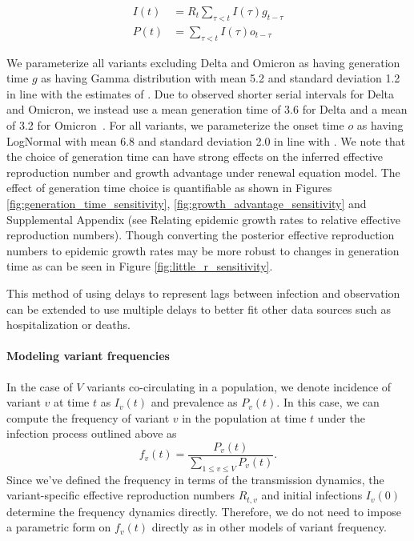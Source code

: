 \begin{align}
  I(t) &= R_{t} \sum_{\tau < t} I(\tau) g_{t-\tau}\\
  P(t) &= \sum_{\tau < t} I(\tau) o_{t-\tau}
\end{align}

We parameterize all variants excluding Delta and Omicron as having generation time $g$ as having Gamma distribution with mean 5.2 and standard deviation 1.2 in line with the estimates of \cite{Ganyani2020}.
Due to observed shorter serial intervals for Delta and Omicron, we instead use a mean generation time of 3.6 for Delta and a mean of 3.2 for Omicron\ \cite{Backer2022, Ryu2022, Song2022}.
For all variants, we parameterize the onset time $o$ as having LogNormal with mean 6.8 and standard deviation 2.0 in line with \cite{Cheng2021}.
We note that the choice of generation time can have strong effects on the inferred effective reproduction number and growth advantage under renewal equation model.
The effect of generation time choice is quantifiable as shown in Figures \ref{fig:generation_time_sensitivity}, \ref{fig:growth_advantage_sensitivity} and Supplemental Appendix (see Relating epidemic growth rates to relative effective reproduction numbers).
Though converting the posterior effective reproduction numbers to epidemic growth rates may be more robust to changes in generation time as can be seen in Figure \ref{fig:little_r_sensitivity}.

This method of using delays to represent lags between infection and observation can be extended to use multiple delays to better fit other data sources such as hospitalization or deaths.

\paragraph{Modeling variant frequencies}%

In the case of $V$ variants co-circulating in a population, we denote incidence of variant $v$ at time $t$ as $I_{v}(t)$ and prevalence as $P_{v}(t)$.
In this case, we can compute the frequency of variant $v$ in the population at time $t$ under the infection process outlined above as
\begin{equation}
  f_{v}(t) = \frac{P_{v}(t)}{ \sum_{1\leq v \leq V} P_{v}(t)}.
\end{equation}
Since we've defined the frequency in terms of the transmission dynamics, the variant-specific effective reproduction numbers $R_{t,v}$ and initial infections $I_{v}(0)$ determine the frequency dynamics directly.
Therefore, we do not need to impose a parametric form on $f_{v}(t)$ directly as in other models of variant frequency.

